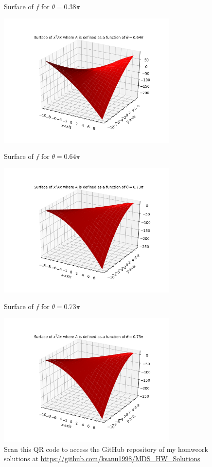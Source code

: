 \documentclass{article}
\begin{document}
\begin{flushleft}
\begin{figure}[htp]
        \caption{Surface of $f$ for $\theta=0.38\pi$}
\end{figure}
\begin{figure}[htp]
        \centering
        \includegraphics[width=9cm]{64pi.png}\\
        \caption{Surface of $f$ for $\theta=0.64\pi$}
\end{figure}
\begin{figure}[htp]
        \centering
        \includegraphics[width=9cm]{73pi.png}\\
        \caption{Surface of $f$ for $\theta=0.73\pi$}
\end{figure}
\begin{figure}[htp]
        \centering
        \includegraphics[width=9cm]{73pi.png}\\
        Scan this QR code to access the GitHub repository of my homweork solutions at \href{https://github.com/ksanu1998/MDS_HW_Solutions}{https://github.com/ksanu1998/MDS\_HW\_Solutions}
\end{figure}
\end{flushleft}
\end{document}
